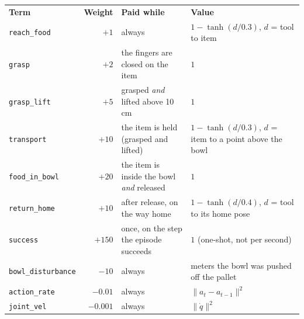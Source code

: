 \documentclass[border=12pt]{standalone}
\newcommand{\headrule}{\noalign{\global\arrayrulewidth=1.2pt}\hline\noalign{\global\arrayrulewidth=0.4pt}}
\begin{document}
\begin{tabular}{|l|r|L{6.0cm}|L{5.6cm}|}
\hline
\textbf{Term} & \textbf{Weight} & \textbf{Paid while} & \textbf{Value} \\
\headrule
\texttt{reach\_food}  & $+1$    & always & $1-\tanh(d/0.3)$, $d$ = tool to item \\ \hline
\texttt{grasp}        & $+2$    & the fingers are closed on the item & $1$ \\ \hline
\texttt{grasp\_lift}  & $+5$    & grasped \emph{and} lifted above 10\,cm & $1$ \\ \hline
\texttt{transport}    & $+10$   & the item is held (grasped and lifted) & $1-\tanh(d/0.3)$, $d$ = item to a point above the bowl \\ \hline
\texttt{food\_in\_bowl} & $+20$ & the item is inside the bowl \emph{and} released & $1$ \\ \hline
\texttt{return\_home} & $+10$   & after release, on the way home & $1-\tanh(d/0.4)$, $d$ = tool to its home pose \\
\headrule
\texttt{success}      & $+150$  & once, on the step the episode succeeds & $1$ (one-shot, not per second) \\
\headrule
\texttt{bowl\_disturbance} & $-10$ & always & meters the bowl was pushed off the pallet \\ \hline
\texttt{action\_rate} & $-0.01$  & always & $\lVert a_t - a_{t-1}\rVert^2$ \\ \hline
\texttt{joint\_vel}   & $-0.001$ & always & $\lVert \dot{q}\rVert^2$ \\
\hline
\end{tabular}
\end{document}
